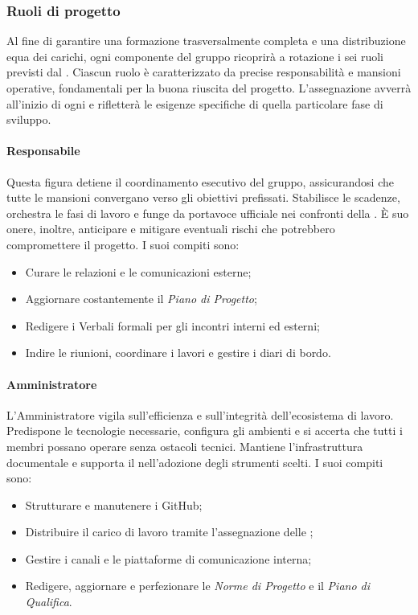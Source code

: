 \documentclass[documento]{gpt}
\begin{document}
	\subsubsection{Ruoli di progetto}
	Al fine di garantire una formazione trasversalmente completa e una distribuzione equa dei carichi, ogni componente del gruppo ricoprirà a rotazione i sei ruoli previsti dal . Ciascun ruolo è caratterizzato da precise responsabilità e mansioni operative, fondamentali per la buona riuscita del progetto. L'assegnazione avverrà all'inizio di ogni  e rifletterà le esigenze specifiche di quella particolare fase di sviluppo.
	
	\paragraph{Responsabile}
	Questa figura detiene il coordinamento esecutivo del gruppo, assicurandosi che tutte le mansioni convergano verso gli obiettivi prefissati. Stabilisce le scadenze, orchestra le fasi di lavoro e funge da portavoce ufficiale nei confronti della . È suo onere, inoltre, anticipare e mitigare eventuali rischi che potrebbero compromettere il progetto.
	I suoi compiti sono:
	\begin{itemize}
		\item Curare le relazioni e le comunicazioni esterne;
		\item Aggiornare costantemente il \textit{Piano di Progetto};
		\item Redigere i Verbali formali per gli incontri interni ed esterni;
		\item Indire le riunioni, coordinare i lavori e gestire i diari di bordo.
	\end{itemize}
	
	\paragraph{Amministratore}
	L'Amministratore vigila sull'efficienza e sull'integrità dell'ecosistema di lavoro. Predispone le tecnologie necessarie, configura gli ambienti e si accerta che tutti i membri possano operare senza ostacoli tecnici. Mantiene l'infrastruttura documentale e supporta il  nell'adozione degli strumenti scelti.
	I suoi compiti sono:
	\begin{itemize}
		\item Strutturare e manutenere i  GitHub;
		\item Distribuire il carico di lavoro tramite l'assegnazione delle ;
		\item Gestire i canali e le piattaforme di comunicazione interna;
		\item Redigere, aggiornare e perfezionare le \textit{Norme di Progetto} e il \textit{Piano di Qualifica}.
	\end{itemize}
	
\end{document}
